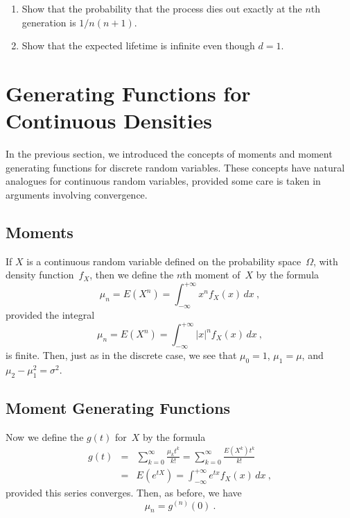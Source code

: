 \begin{LJSItem}
\begin{enumerate}
\item Show that the probability that the process dies out exactly at the
$n$th generation is $1/n(n + 1)$.

\item Show that the expected lifetime is infinite even though $d = 1$.
\end{enumerate}
\end{LJSItem}

\section[Continuous Densities]{Generating Functions for Continuous Densities}\label{sec
10.3} In the previous section, we introduced
the concepts of moments and moment generating functions for discrete random variables.  These
concepts have natural analogues for continuous random variables, provided some care is taken
in arguments involving convergence.

\subsection*{Moments}
If $X$ is a continuous random variable defined on the probability
space~$\Omega$, with density function~$f_X$, then we define the $n$th moment
of~$X$ by the formula
$$
\mu_n = E(X^n) = \int_{-\infty}^{+\infty} x^n f_X(x)\, dx\ ,
$$
provided the integral 
$$
\mu_n = E(X^n) = \int_{-\infty}^{+\infty} |x|^n f_X(x)\, dx\ ,
$$
is finite.  Then, just as in the discrete case, we see
that $\mu_0 = 1$, $\mu_1 = \mu$, and $\mu_2 - \mu_1^2 = \sigma^2$.

\subsection*{Moment Generating Functions} Now we define the  $g(t)$ for~$X$ by the
formula
\begin{eqnarray*}
g(t) &=& \sum_{k = 0}^\infty \frac{\mu_k t^k}{k!} = \sum_{k = 0}^\infty
\frac{E(X^k) t^k}{k!} \\
     &=& E(e^{tX}) = \int_{-\infty}^{+\infty} e^{tx} f_X(x)\, dx\ ,
\end{eqnarray*}
provided this series converges.  Then, as before, we have
$$
\mu_n = g^{(n)}(0)\ .
$$

